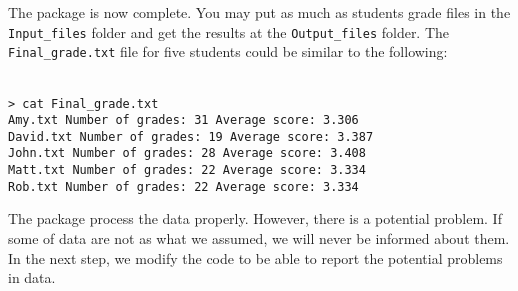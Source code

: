 \noindent
The package is now complete. You may put as much as students grade files in the \texttt{Input\_files} folder and get the results at the \texttt{Output\_files} folder. The \texttt{Final\_grade.txt} file for five students could be similar to the following:

\begin{mdframed}[hidealllines=true,backgroundcolor=gray!20]
\begin{singlespace}
\fontsize{10pt}{1pt}
\texttt{
\\
> cat Final\_grade.txt \\
Amy.txt \phantom{x}\hspace{3ex}     Number of grades:  31  Average score:  3.306 \\
David.txt \phantom{x}\hspace{1ex}   Number of grades:  19  Average score:  3.387 \\
John.txt \phantom{x}\hspace{2ex}    Number of grades:  28  Average score:  3.408 \\
Matt.txt \phantom{x}\hspace{2ex}    Number of grades:  22  Average score:  3.334 \\
Rob.txt  \phantom{x}\hspace{3ex}     Number of grades:  22  Average score:  3.334 \\
 }
\end{singlespace}
\end{mdframed}
\noindent
The package process the data properly. However, there is a potential problem. If some of data are not as what we assumed, we will never be informed about them. In the next step, we modify the code to be able to report the potential problems in data.\\


